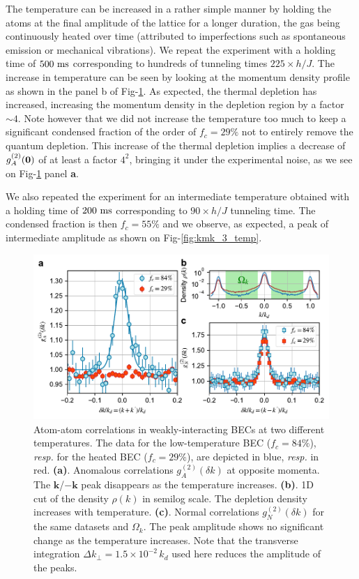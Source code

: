 The temperature can be increased in a rather simple manner by holding the atoms at the final amplitude of the lattice for a longer duration, the gas being continuously heated over time (attributed to imperfections such as spontaneous emission or mechanical vibrations). We repeat the experiment with a holding time of $500 \ \rm{ms}$ corresponding to hundreds of tunneling times $225 \times h/J$. The increase in temperature can be seen by looking at the momentum density profile as shown in the panel b of Fig-\ref{fig:kmk_temperature}. As expected, the thermal depletion has increased, increasing the momentum density in the depletion region by a factor $\sim 4$. Note however that we did not increase the temperature too much to keep a significant condensed fraction of the order of $f_c = 29 \%$ not to entirely remove the quantum depletion. This increase of the thermal depletion implies a decrease of $g^{(2)}_A (\bm{0})$ of at least a factor $4^2$, bringing it under the experimental noise, as we see on Fig-\ref{fig:kmk_temperature} panel \textbf{a}.

We also repeated the experiment for an intermediate temperature obtained with a holding time of $200 \ \rm{ms}$ corresponding to $90 \times h/J$ tunneling time. The condensed fraction is then $f_c=55 \%$ and we observe, as expected, a peak of intermediate amplitude as shown on Fig-\ref{fig:kmk_3_temp}.

\begin{figure}
    \centering
    \includegraphics[width=\textwidth]{Fig/Chapter4/kmk_temperature_error_bars.pdf}
    \caption{Atom-atom correlations in weakly-interacting BECs at two different temperatures. The data for the low-temperature BEC ($f_{c}=84\%$), {\it resp.} for the heated BEC ($f_{c}=29\%$), are depicted in blue, {\it resp.} in red. 
    {\bf (a)}. Anomalous correlations $g_{A}^{(2)}(\delta k)$ at opposite momenta. The ${\bm k}$/$-{\bm k}$ peak disappears as the temperature increases.
    {\bf (b)}. 1D cut of the density $\rho(k)$ in semilog scale. The depletion density increases with temperature.
    {\bf (c)}. Normal correlations $g_{N}^{(2)}(\delta k)$ for the same datasets and $\Omega_k$. The peak amplitude shows no significant change as the temperature increases. Note that the transverse integration $\Delta k_{\perp}=1.5 \times 10^{-2} \, k_d$ used here reduces the amplitude of the peaks.}
    \label{fig:kmk_temperature}
\end{figure}

